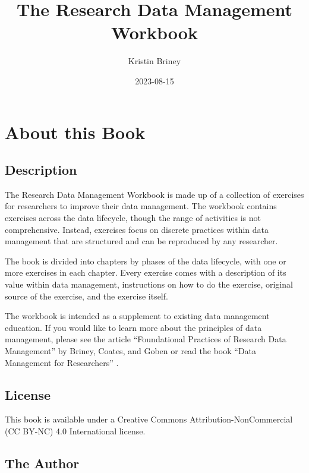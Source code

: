 \documentclass[
]{book}
\title{The Research Data Management Workbook}
\author{Kristin Briney}
\date{2023-08-15}
\begin{document}
\maketitle

{
\setcounter{tocdepth}{1}
\tableofcontents
}
\hypertarget{about-this-book}{%
\chapter*{About this Book}\label{about-this-book}}

\hypertarget{description}{%
\section*{Description}\label{description}}

The Research Data Management Workbook is made up of a collection of exercises for researchers to improve their data management. The workbook contains exercises across the data lifecycle, though the range of activities is not comprehensive. Instead, exercises focus on discrete practices within data management that are structured and can be reproduced by any researcher.

The book is divided into chapters by phases of the data lifecycle, with one or more exercises in each chapter. Every exercise comes with a description of its value within data management, instructions on how to do the exercise, original source of the exercise, and the exercise itself.

The workbook is intended as a supplement to existing data management education. If you would like to learn more about the principles of data management, please see the article ``Foundational Practices of Research Data Management'' by Briney, Coates, and Goben \citep{briney_foundational_2020} or read the book ``Data Management for Researchers'' \citep{briney_data_2015}.

\hypertarget{license}{%
\section*{License}\label{license}}

This book is available under a Creative Commons Attribution-NonCommercial (CC BY-NC) 4.0 International license.

\hypertarget{the-author}{%
\section*{The Author}\label{the-author}}
\end{document}
